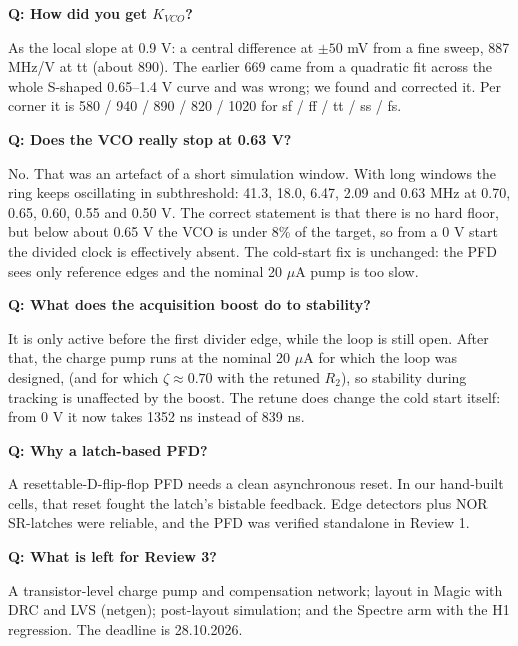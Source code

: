 \documentclass[11pt,a4paper]{article}
\newcommand{\qa}[2]{\par\smallskip\noindent\textbf{Q: #1}\par\noindent\hspace*{1em}\begin{minipage}[t]{\dimexpr\linewidth-1em}#2\end{minipage}\par}
\begin{document}
\qa{How did you get $K_{VCO}$?}{As the local slope at 0.9 V: a central difference at $\pm50$ mV from a fine sweep, 887 MHz/V at tt (about 890). The earlier 669 came from a quadratic fit across the whole S-shaped 0.65--1.4 V curve and was wrong; we found and corrected it. Per corner it is 580 / 940 / 890 / 820 / 1020 for sf / ff / tt / ss / fs.}

\qa{Does the VCO really stop at 0.63 V?}{No. That was an artefact of a short simulation window. With long windows the ring keeps oscillating in subthreshold: 41.3, 18.0, 6.47, 2.09 and 0.63 MHz at 0.70, 0.65, 0.60, 0.55 and 0.50 V. The correct statement is that there is no hard floor, but below about 0.65 V the VCO is under 8\% of the target, so from a 0 V start the divided clock is effectively absent. The cold-start fix is unchanged: the PFD sees only reference edges and the nominal 20 $\mu$A pump is too slow.}

\qa{What does the acquisition boost do to stability?}{It is only active before the first divider edge, while the loop is still open. After that, the charge pump runs at the nominal 20 $\mu$A for which the loop was designed, (and for which $\zeta\approx0.70$ with the retuned $R_2$), so stability during tracking is unaffected by the boost. The retune does change the cold start itself: from 0 V it now takes 1352 ns instead of 839 ns.}

\qa{Why a latch-based PFD?}{A resettable-D-flip-flop PFD needs a clean asynchronous reset. In our hand-built cells, that reset fought the latch's bistable feedback. Edge detectors plus NOR SR-latches were reliable, and the PFD was verified standalone in Review 1.}

\qa{What is left for Review 3?}{A transistor-level charge pump and compensation network; layout in Magic with DRC and LVS (netgen); post-layout simulation; and the Spectre arm with the H1 regression. The deadline is 28.10.2026.}

\end{document}

